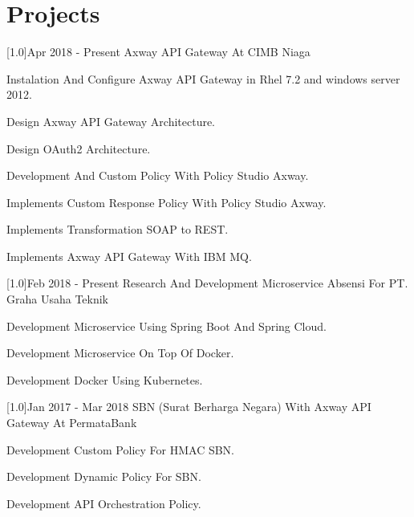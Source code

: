 \documentclass[english]{cv-style}
\begin{document}
\section{Projects}
\vspace{-0.3cm}
\begin{entrylist}
\entry
{\scalebox{.6}[1.0]{Apr 2018 - Present}}
{Axway API Gateway At CIMB Niaga}
{}
{\vspace{-0.3cm}
  \begin{itemize}\small{
    \item Instalation And Configure Axway API Gateway in Rhel 7.2 and windows server 2012.
    \item Design Axway API Gateway Architecture.
    \item Design OAuth2 Architecture.
    \item Development And Custom Policy With Policy Studio Axway.
    \item Implements Custom Response Policy With Policy Studio Axway.
    \item Implements Transformation SOAP to REST.
    \item Implements Axway API Gateway With IBM MQ.}
  \end{itemize}}
\entry
{\scalebox{.6}[1.0]{Feb 2018 - Present}}
{Research And Development Microservice Absensi For PT. Graha Usaha Teknik}
{}
{\vspace{-0.3cm}
  \begin{itemize}\small{
    \item Development Microservice Using Spring Boot And Spring Cloud.
    \item Development Microservice On Top Of Docker.
    \item Development Docker Using Kubernetes.}
  \end{itemize}}
\entry
{\scalebox{.6}[1.0]{Jan 2017 - Mar 2018}}
{SBN (Surat Berharga Negara) With Axway API Gateway At PermataBank}
{}
{\vspace{-0.3cm}
  \begin{itemize}\small{
    \item Development Custom Policy For HMAC SBN.
    \item Development Dynamic Policy For SBN.
    \item Development API Orchestration Policy.}
  \end{itemize}}
\entry

\end{entrylist}
\end{document}
